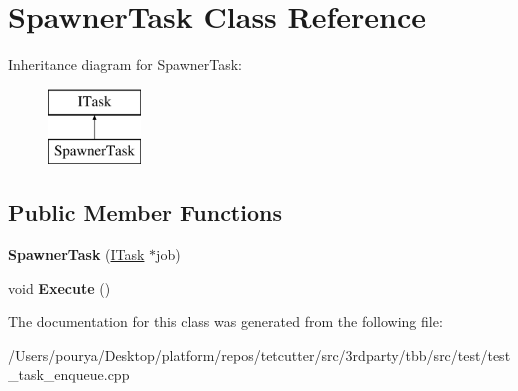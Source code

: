 \hypertarget{classSpawnerTask}{}\section{Spawner\+Task Class Reference}
\label{classSpawnerTask}
Inheritance diagram for Spawner\+Task\+:\begin{figure}[H]
\begin{center}
\leavevmode
\includegraphics[height=2.000000cm]{classSpawnerTask}
\end{center}
\end{figure}
\subsection*{Public Member Functions}
\begin{DoxyCompactItemize}
\item 
\hypertarget{classSpawnerTask_a2beffcc8cc6723b088bc1587423666d9}{}{\bfseries Spawner\+Task} (\hyperlink{classITask}{I\+Task} $\ast$job)\label{classSpawnerTask_a2beffcc8cc6723b088bc1587423666d9}

\item 
\hypertarget{classSpawnerTask_affef34f9728e327b97830d4e07738dee}{}void {\bfseries Execute} ()\label{classSpawnerTask_affef34f9728e327b97830d4e07738dee}

\end{DoxyCompactItemize}


The documentation for this class was generated from the following file\+:\begin{DoxyCompactItemize}
\item 
/\+Users/pourya/\+Desktop/platform/repos/tetcutter/src/3rdparty/tbb/src/test/test\+\_\+task\+\_\+enqueue.\+cpp\end{DoxyCompactItemize}
